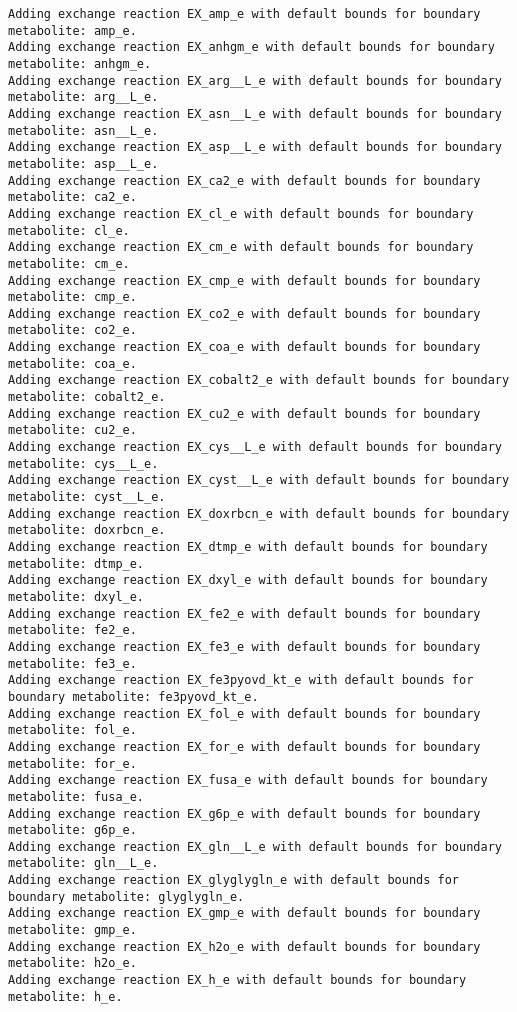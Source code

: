 \documentclass[
  letterpaper,
  DIV=11,
  numbers=noendperiod]{scrartcl}
\begin{document}
\begin{verbatim}
Adding exchange reaction EX_amp_e with default bounds for boundary metabolite: amp_e.
Adding exchange reaction EX_anhgm_e with default bounds for boundary metabolite: anhgm_e.
Adding exchange reaction EX_arg__L_e with default bounds for boundary metabolite: arg__L_e.
Adding exchange reaction EX_asn__L_e with default bounds for boundary metabolite: asn__L_e.
Adding exchange reaction EX_asp__L_e with default bounds for boundary metabolite: asp__L_e.
Adding exchange reaction EX_ca2_e with default bounds for boundary metabolite: ca2_e.
Adding exchange reaction EX_cl_e with default bounds for boundary metabolite: cl_e.
Adding exchange reaction EX_cm_e with default bounds for boundary metabolite: cm_e.
Adding exchange reaction EX_cmp_e with default bounds for boundary metabolite: cmp_e.
Adding exchange reaction EX_co2_e with default bounds for boundary metabolite: co2_e.
Adding exchange reaction EX_coa_e with default bounds for boundary metabolite: coa_e.
Adding exchange reaction EX_cobalt2_e with default bounds for boundary metabolite: cobalt2_e.
Adding exchange reaction EX_cu2_e with default bounds for boundary metabolite: cu2_e.
Adding exchange reaction EX_cys__L_e with default bounds for boundary metabolite: cys__L_e.
Adding exchange reaction EX_cyst__L_e with default bounds for boundary metabolite: cyst__L_e.
Adding exchange reaction EX_doxrbcn_e with default bounds for boundary metabolite: doxrbcn_e.
Adding exchange reaction EX_dtmp_e with default bounds for boundary metabolite: dtmp_e.
Adding exchange reaction EX_dxyl_e with default bounds for boundary metabolite: dxyl_e.
Adding exchange reaction EX_fe2_e with default bounds for boundary metabolite: fe2_e.
Adding exchange reaction EX_fe3_e with default bounds for boundary metabolite: fe3_e.
Adding exchange reaction EX_fe3pyovd_kt_e with default bounds for boundary metabolite: fe3pyovd_kt_e.
Adding exchange reaction EX_fol_e with default bounds for boundary metabolite: fol_e.
Adding exchange reaction EX_for_e with default bounds for boundary metabolite: for_e.
Adding exchange reaction EX_fusa_e with default bounds for boundary metabolite: fusa_e.
Adding exchange reaction EX_g6p_e with default bounds for boundary metabolite: g6p_e.
Adding exchange reaction EX_gln__L_e with default bounds for boundary metabolite: gln__L_e.
Adding exchange reaction EX_glyglygln_e with default bounds for boundary metabolite: glyglygln_e.
Adding exchange reaction EX_gmp_e with default bounds for boundary metabolite: gmp_e.
Adding exchange reaction EX_h2o_e with default bounds for boundary metabolite: h2o_e.
Adding exchange reaction EX_h_e with default bounds for boundary metabolite: h_e.

\end{verbatim}
\end{document}
